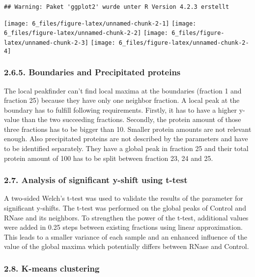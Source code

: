 \documentclass[
  12pt,
]{article}
\begin{document}
\begin{verbatim}
## Warning: Paket 'ggplot2' wurde unter R Version 4.2.3 erstellt
\end{verbatim}

\texttt{[image: 6\_files/figure-latex/unnamed-chunk-2-1]}
\texttt{[image: 6\_files/figure-latex/unnamed-chunk-2-2]}
\texttt{[image: 6\_files/figure-latex/unnamed-chunk-2-3]}
\texttt{[image: 6\_files/figure-latex/unnamed-chunk-2-4]}

\hypertarget{boundaries-and-precipitated-proteins}{%
\subsubsection{2.6.5. Boundaries and Precipitated
proteins}\label{boundaries-and-precipitated-proteins}}

The local peakfinder can't find local maxima at the boundaries (fraction
1 and fraction 25) because they have only one neighbor fraction. A local
peak at the boundary has to fulfill following requirements. Firstly, it
has to have a higher y-value than the two succeeding fractions.
Secondly, the protein amount of those three fractions has to be bigger
than 10. Smaller protein amounts are not relevant enough. Also
precipitated proteins are not described by the parameters and have to be
identified separately. They have a global peak in fraction 25 and their
total protein amount of 100 has to be split between fraction 23, 24 and
25.

\hypertarget{analysis-of-significant-y-shift-using-t-test}{%
\subsubsection{2.7. Analysis of significant y-shift using
t-test}\label{analysis-of-significant-y-shift-using-t-test}}

A two-sided Welch's t-test was used to validate the results of the
parameter for significant y-shifts. The t-test was performed on the
global peaks of Control and RNase and its neighbors. To strengthen the
power of the t-test, additional values were added in 0.25 steps between
existing fractions using linear approximation. This leads to a smaller
variance of each sample and an enhanced influence of the value of the
global maxima which potentially differs between RNase and Control.

\hypertarget{k-means-clustering}{%
\subsubsection{2.8. K-means clustering}\label{k-means-clustering}}
\end{document}
